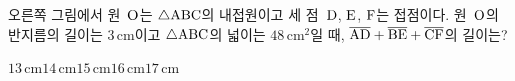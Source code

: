 \noindent\begin{minipage}[t]{0.58\linewidth}\vspace{0pt}\raggedright 오른쪽 그림에서 원~$\mathrm{O}$는 $\triangle\mathrm{ABC}$의 내접원이고 세 점~$\mathrm{D}$, $\mathrm{E}$, $\mathrm{F}$는 접점이다. 원~$\mathrm{O}$의 반지름의 길이는 $3\,\mathrm{cm}$이고 $\triangle\mathrm{ABC}$의 넓이는 $48\,\mathrm{cm}^2$일 때, $\overline{\mathrm{AD}}+\overline{\mathrm{BE}}+\overline{\mathrm{CF}}$의 길이는?\end{minipage}\hfill\begin{minipage}[t]{0.4\linewidth}\vspace{0pt}\centering \resizebox{\ifdim\width>\linewidth\linewidth\else\width\fi}{!}{}\end{minipage}\par
\begin{choices32}{$13\,\mathrm{cm}$}{$14\,\mathrm{cm}$}{$15\,\mathrm{cm}$}{$16\,\mathrm{cm}$}{$17\,\mathrm{cm}$}\end{choices32}
